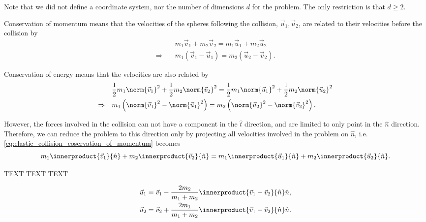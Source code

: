 Note that we did not define a coordinate system, nor the number of dimensions $d$ for the problem. The only restriction is that $d\geq2$.

Conservation of momentum means that the velocities of the spheres following the collision, $\vec{u}_{1},\vec{u}_2$, are related to their velocities before the collision by
\begin{equation}
	\begin{aligned}
		                 & m_{1}\vec{v}_{1} + m_{2}\vec{v}_{2} = m_{1}\vec{u}_{1} + m_{2}\vec{u}_{2}                   \\
		\Rightarrow\quad & m_{1}\left(\vec{v}_{1} - \vec{u}_{1}\right)  = m_{2}\left(\vec{u}_{2} - \vec{v}_{2}\right).
	\end{aligned}
	\label{eq:elastic_collision_coservation_of_momentum}
\end{equation}

Conservation of energy means that the velocities are also related by
\begin{equation}
	\begin{aligned}
		                 & \frac{1}{2}m_{1}\norm{\vec{v}_{1}}^{2} + \frac{1}{2}m_{2}\norm{\vec{v}_{2}}^{2} = \frac{1}{2}m_{1}\norm{\vec{u}_{1}}^{2} + \frac{1}{2}m_{2}\norm{\vec{u}_{2}}^{2} \\
		\Rightarrow\quad & m_{1}\left(\norm{\vec{v}_{1}}^{2} - \norm{\vec{u}_{1}}^{2}\right) = m_{2}\left(\norm{\vec{u}_{2}}^{2} - \norm{\vec{v}_{2}}^{2}\right).
	\end{aligned}
	\label{eq:elastic_collision_coservation_of_energy}
\end{equation}

However, the forces involved in the collision can not have a component in the $\hat{t}$ direction, and are limited to only point in the $\hat{n}$ direction. Therefore, we can reduce the problem to this direction only by projecting all velocities involved in the problem on $\hat{n}$, i.e. \autoref{eq:elastic_collision_coservation_of_momentum} becomes
\begin{equation}
	m_{1}\innerproduct{\vec{v}_{1}}{\hat{n}} + m_{2}\innerproduct{\vec{v}_{2}}{\hat{n}} = m_{1}\innerproduct{\vec{u}_{1}}{\hat{n}} + m_{2}\innerproduct{\vec{u}_{2}}{\hat{n}}.
	\label{eq:elastic_collision_coservation_of_momentum_projection}
\end{equation}

TEXT TEXT TEXT

\begin{equation}
	\begin{aligned}
		\vec{u}_{1} & = \vec{v}_{1} - \frac{2m_{2}}{m_{1}+m_{2}}\innerproduct{\vec{v}_{1}-\vec{v}_{2}}{\hat{n}}\hat{n}, \\
		\vec{u}_{2} & = \vec{v}_{2} + \frac{2m_{1}}{m_{1}+m_{2}}\innerproduct{\vec{v}_{1}-\vec{v}_{2}}{\hat{n}}\hat{n}.
	\end{aligned}
\end{equation}

